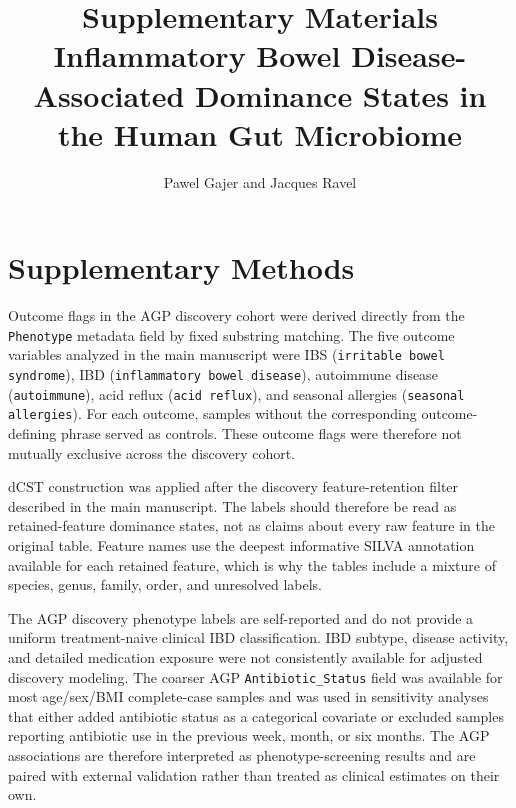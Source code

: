 \documentclass[11pt]{article}
\title{Supplementary Materials\\Inflammatory Bowel Disease-Associated Dominance States in the Human Gut Microbiome}
\author{Pawel Gajer and Jacques Ravel}
\date{}
\newcommand{\agpantibioticstatus}{\texttt{Antibiotic\_\allowbreak Status}}
\newif\ifshowbuildstamp
\providecommand{\manuscriptbuilddatetime}{unknown}
\begin{document}
\maketitle
\ifshowbuildstamp
\begin{center}
\footnotesize
Built \manuscriptbuilddatetime
\end{center}
\vspace{0.35em}
\fi

\section*{Supplementary Methods}

Outcome flags in the AGP discovery cohort were derived directly from the
\texttt{Phenotype} metadata field by fixed substring matching. The five
outcome variables analyzed in the main manuscript were IBS (\texttt{irritable bowel
syndrome}), IBD (\texttt{inflammatory bowel disease}), autoimmune disease
(\texttt{autoimmune}), acid reflux (\texttt{acid reflux}), and seasonal
allergies (\texttt{seasonal allergies}). For each outcome, samples
without the corresponding outcome-defining phrase served as controls.
These outcome flags were therefore not mutually exclusive across the
discovery cohort.

dCST construction was applied after the discovery feature-retention
filter described in the main manuscript. The labels should therefore be
read as retained-feature dominance states, not as claims about every raw
feature in the original table. Feature names use the deepest informative
SILVA annotation available for each retained feature, which is why the
tables include a mixture of species, genus, family, order, and unresolved
labels.

The AGP discovery phenotype labels are self-reported and do not provide a
uniform treatment-naive clinical IBD classification. IBD subtype, disease
activity, and detailed medication exposure were not consistently
available for adjusted discovery modeling. The coarser AGP
\agpantibioticstatus{} field was available for most age/sex/BMI
complete-case samples and was used in sensitivity analyses that either
added antibiotic status as a categorical covariate or excluded samples
reporting antibiotic use in the previous week, month, or six months. The
AGP associations are therefore interpreted as phenotype-screening
results and are paired with external validation rather than treated as
clinical estimates on their own.
\end{document}

